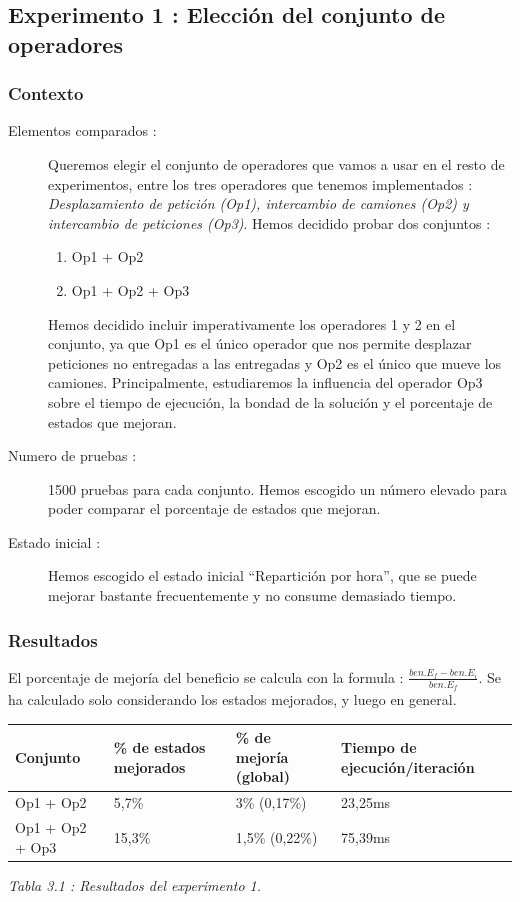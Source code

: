 \documentclass{article}
\begin{document}
\subsection{Experimento 1 : Elección del conjunto de operadores}


\subsubsection{Contexto}

\begin{description}
\item[Elementos comparados :] Queremos elegir el conjunto de operadores que
vamos a usar en el resto de experimentos, entre los tres operadores que tenemos
implementados : \emph{Desplazamiento de petición (Op1), intercambio de camiones
(Op2) y intercambio de peticiones (Op3)}. Hemos decidido probar dos conjuntos :
\begin{enumerate}
\item Op1 + Op2
\item Op1 + Op2 + Op3
\end{enumerate}
Hemos decidido incluir imperativamente los operadores 1 y 2 en el conjunto, ya
que Op1 es el único operador que nos permite desplazar peticiones no entregadas
a las entregadas y Op2 es el único que mueve los camiones. Principalmente,
estudiaremos la influencia del operador Op3 sobre el tiempo de ejecución, la
bondad de la solución y el porcentaje de estados que mejoran.
\item[Numero de pruebas :] 1500 pruebas para cada conjunto. Hemos escogido un
número elevado para poder comparar el porcentaje de estados que mejoran.
\item[Estado inicial :] Hemos escogido el estado inicial ``Repartición por
hora'', que se puede mejorar bastante frecuentemente y no consume demasiado
tiempo.
\end{description}

\subsubsection{Resultados}

El porcentaje de mejoría del beneficio se calcula con la formula :
$\frac{ben. E_f - ben. E_i}{ben. E_f}$. Se ha calculado solo considerando los
estados mejorados, y luego en general.
\begin{center}
\begin{tabular}{|l|l|l|l|}
\hline
Conjunto & \% de estados mejorados & \% de mejoría (global) & Tiempo de
ejecución/iteración\\
\hline
Op1 + Op2 & 5,7\% & 3\% (0,17\%) & 23,25ms\\
\hline
Op1 + Op2 + Op3 & 15,3\% & 1,5\% (0,22\%) & 75,39ms\\
\hline
\end{tabular}
{\it Tabla 3.1 : Resultados del experimento 1.}
\end{center}
\end{document}
